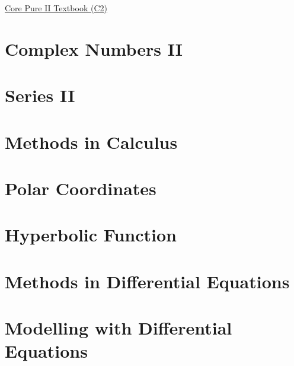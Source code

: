 \href{https://drive.google.com/drive/folders/1le-4uediDAlxbglAtcbnSlPrLuQiPTE3}{\hypertarget{book:C2}{Core Pure II Textbook (C2)}}

\section{Complex Numbers II} \label{complex_numbers_ii}
\newpage
\section{Series II} \label{series_ii}
\newpage
\section{Methods in Calculus} \label{methods_in_calculus}
\newpage
\section{Polar Coordinates} \label{polar_coordinates}
\newpage
\section{Hyperbolic Function} \label{hyperbolic_functions}
\newpage
\section{Methods in Differential Equations} \label{methods_in_differential_equations}
\newpage
\section{Modelling with Differential Equations} \label{nodelling_with_differential_equations}
\newpage
